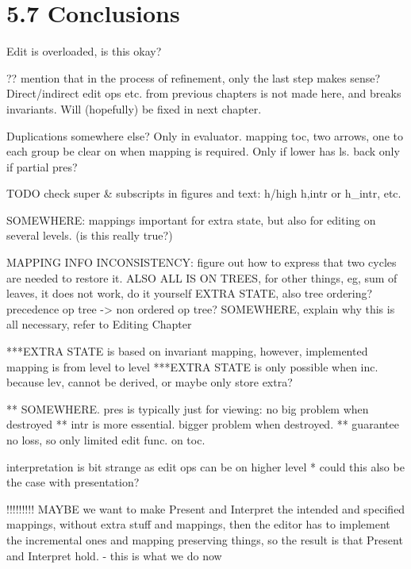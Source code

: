\section{5.7 Conclusions}










\bc
Edit is overloaded, is this okay?


?? mention that in the process of refinement, only the last step makes sense? Direct/indirect edit ops etc. from previous chapters is not made here, and breaks invariants. Will (hopefully) be fixed in next chapter.


Duplications somewhere else? Only in evaluator.
mapping toc, two arrows, one to each group
be clear on when mapping is required. Only if lower has ls. back only if partial pres?



TODO
check super & subscripts in figures and text: h/high h,intr or h_intr, etc.

SOMEWHERE: mappings important for extra state, but also for editing on several levels. (is this really true?)

MAPPING INFO INCONSISTENCY: figure out how to express that two cycles are needed to restore it.
ALSO ALL IS ON TREES, for other things, eg, sum of leaves, it does not work, do it yourself
EXTRA STATE, also tree ordering? precedence op tree -> non ordered op tree?
SOMEWHERE, explain why this is all necessary, refer to Editing Chapter


***EXTRA STATE is based on invariant mapping, however, implemented mapping is from level to level
***EXTRA STATE is only possible when inc. because lev, cannot be derived, or maybe only store extra?

** SOMEWHERE. pres is typically just for viewing: no big problem when destroyed
** intr is more essential. bigger problem when destroyed.
** guarantee no loss, so only limited edit func. on toc.

interpretation is bit strange as edit ops can be on higher level
* could this also be the case with presentation?


!!!!!!!!!
MAYBE we want to make Present and Interpret the intended and specified mappings, 
without extra stuff and mappings, then the editor has to implement the incremental ones
 and mapping preserving things, so the result is that Present and Interpret hold.
- this is what we do now

